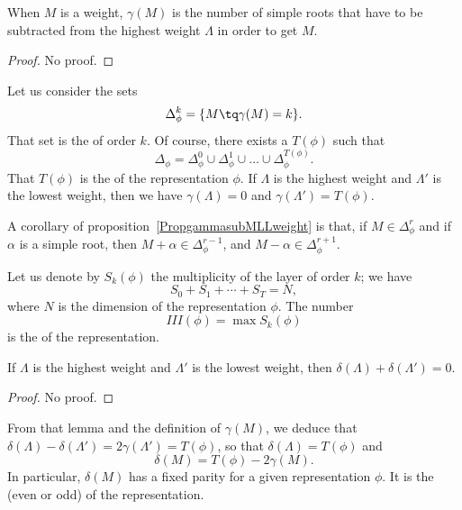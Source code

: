 \begin{proposition}     \label{PropgammasubMLLweight}
	When $M$ is a weight, $\gamma(M)$ is the number of simple roots that have to be subtracted from the highest weight $\Lambda$ in order to get $M$.
\end{proposition}
\begin{proof}
	No proof.
\end{proof}

Let us consider the sets
\begin{equation}
	\Delta_{\phi}^k=\{ M\tq\gamma(M)=k \}.
\end{equation}
That set is the  of order $k$. Of course, there exists a $T(\phi)$ such that
\begin{equation}
	\Delta_{\phi}=\Delta_{\phi}^0\cup\Delta_{\phi}^1\cup\ldots\cup\Delta_{\phi}^{T(\phi)}.
\end{equation}
That $T(\phi)$ is the  of the representation $\phi$. If $\Lambda$ is the highest weight and $\Lambda'$ is the lowest weight, then we have $\gamma(\Lambda)=0$ and $\gamma(\Lambda')=T(\phi)$.

A corollary of proposition~\ref{PropgammasubMLLweight} is that, if $M\in\Delta_{\phi}^r$ and if $\alpha$ is a simple root, then $M+\alpha\in\Delta_{\phi}^{r-1}$, and $M-\alpha\in\Delta_{\phi}^{r+1}$.

Let us denote by $S_k(\phi)$ the multiplicity of the layer of order $k$; we have
\begin{equation}
	S_0+S_1+\cdots+S_T=N,
\end{equation}
where $N$ is the dimension of the representation $\phi$. The number
\begin{equation}
	III(\phi)=\max S_k(\phi)
\end{equation}
is the  of the representation.

\begin{lemma}
	If $\Lambda$ is the highest weight and $\Lambda'$ is the lowest weight, then $\delta(\Lambda)+\delta(\Lambda')=0$.
\end{lemma}
\begin{proof}
	No proof.
\end{proof}
From that lemma and the definition of $\gamma(M)$, we deduce that $\delta(\Lambda)-\delta(\Lambda')=2\gamma(\Lambda')=T(\phi)$, so that $\delta(\Lambda)=T(\phi)$ and
\begin{equation}
	\delta(M)=T(\phi)-2\gamma(M).
\end{equation}
In particular, $\delta(M)$ has a fixed parity for a given representation $\phi$. It is the  (even or odd) of the representation.

